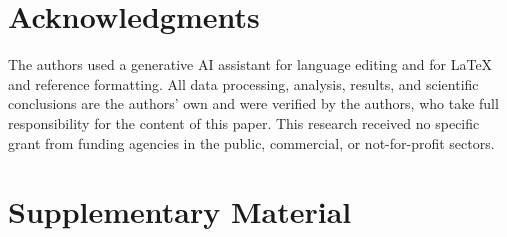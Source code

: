 \documentclass[3p,times,single-column]{elsarticle}
\begin{document}
\section*{Acknowledgments}
The authors used a generative AI assistant for language editing and for LaTeX and reference formatting. All data processing, analysis, results, and scientific conclusions are the authors' own and were verified by the authors, who take full responsibility for the content of this paper.
This research received no specific grant from funding agencies in the public, commercial, or not-for-profit sectors.

\section*{Supplementary Material}




\end{document}
